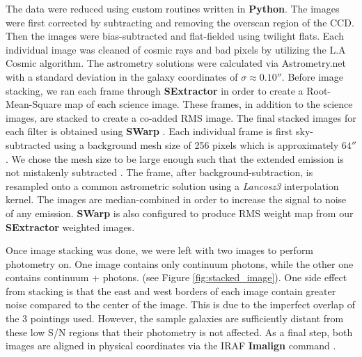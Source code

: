 \documentclass[twocolumn]{aastex6}
\begin{document}
The data were reduced using custom routines written in \textbf{Python}. 
The images were first corrected by subtracting and removing the overscan region of the CCD. 
Then the images were bias-subtracted and flat-fielded using twilight flats. 
Each individual image was cleaned of cosmic rays and bad pixels by utilizing the L.A Cosmic algorithm.
 The astrometry solutions were calculated via Astrometry.net \citep{Lang} with a standard deviation in the galaxy coordinates of $\sigma \approx 0.10''$. 
Before image stacking, we ran each frame through \textbf{SExtractor} \citep{Bertin} in order to create a Root-Mean-Square map of each science image.
 These frames, in addition to the science images, are stacked to create a co-added RMS image.
The final stacked images for each filter is obtained using \textbf{SWarp} \citep{Bertin}.
Each individual frame is first sky-subtracted using a background mesh size of 256 pixels which is approximately $64''$. 
We chose the mesh size to be large enough such that the extended emission is not mistakenly subtracted \citep{Battaia_2015}. 
The frame, after background-subtraction, is resampled onto a common astrometric solution using a \textit{Lancosz3} interpolation kernel. 
The images are median-combined in order to increase the signal to noise of any  emission. \textbf{SWarp} is also configured to produce RMS weight map from our \textbf{SExtractor} weighted images.

Once image stacking was done, we were left with two images to perform photometry on. One image contains only continuum photons, while the other one contains continuum +  photons.  (see Figure \ref{fig:stacked_image}). One side effect from stacking is that the east and west borders of each image contain greater noise compared to the center of the image. This is due to the imperfect overlap of the 3 pointings used. However, the sample galaxies are sufficiently distant from these low S/N regions that their photometry is not affected. As a final step, both images are aligned in physical coordinates via the IRAF \textbf{Imalign} command \citep{Tody_1986}.
\end{document}
